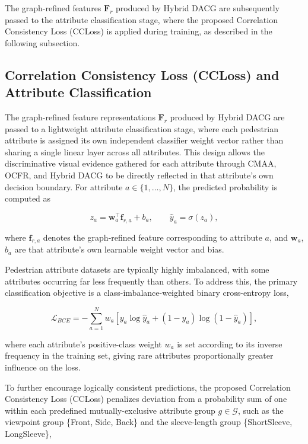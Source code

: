 \documentclass{ieeeaccess}
\begin{document}
The graph-refined features $\mathbf{F}_r$ produced by Hybrid DACG are subsequently passed to the attribute classification stage, where the proposed Correlation Consistency Loss (CCLoss) is applied during training, as described in the following subsection.

\subsection{Correlation Consistency Loss (CCLoss) and Attribute Classification}

The graph-refined feature representations $\mathbf{F}_r$ produced by Hybrid DACG are passed to a lightweight attribute classification stage, where each pedestrian attribute is assigned its own independent classifier weight vector rather than sharing a single linear layer across all attributes. This design allows the discriminative visual evidence gathered for each attribute through CMAA, OCFR, and Hybrid DACG to be directly reflected in that attribute's own decision boundary. For attribute $a\in\{1,\dots,N\}$, the predicted probability is computed as

\begin{equation}
z_{a}=\mathbf{w}_{a}^{\top}\mathbf{f}_{r,a}+b_{a},\qquad \hat{y}_{a}=\sigma(z_{a}),
\label{eq:classifier}
\end{equation}

where $\mathbf{f}_{r,a}$ denotes the graph-refined feature corresponding to attribute $a$, and $\mathbf{w}_{a}$, $b_{a}$ are that attribute's own learnable weight vector and bias.

Pedestrian attribute datasets are typically highly imbalanced, with some attributes occurring far less frequently than others. To address this, the primary classification objective is a class-imbalance-weighted binary cross-entropy loss,

\begin{equation}
\mathcal{L}_{BCE}=-\sum_{a=1}^{N}w_{a}\left[y_{a}\log\hat{y}_{a}+(1-y_{a})\log(1-\hat{y}_{a})\right],
\label{eq:bce}
\end{equation}

where each attribute's positive-class weight $w_{a}$ is set according to its inverse frequency in the training set, giving rare attributes proportionally greater influence on the loss.

To further encourage logically consistent predictions, the proposed Correlation Consistency Loss (CCLoss) penalizes deviation from a probability sum of one within each predefined mutually-exclusive attribute group $g\in\mathcal{G}$, such as the viewpoint group \{Front, Side, Back\} and the sleeve-length group \{ShortSleeve, LongSleeve\},
\end{document}
